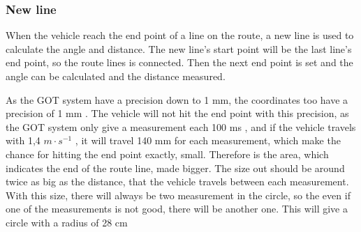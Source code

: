 \subsubsection{New line}
When the vehicle reach the end point of a line on the route, a new line is used to calculate the angle and distance. The new line's start point will be the last line's end point, so the route lines is connected. Then the next end point is set and the angle can be calculated and the distance measured.

As the GOT system have a precision down to 1 mm, the coordinates too have a precision of 1 mm . The vehicle will not hit the end point with this precision, as the GOT system only give a measurement each 100 ms , and if the vehicle travels with 1,4 $m \cdot s^{-1}$ , it will travel 140 mm for each measurement, which make the chance for hitting the end point exactly, small. Therefore is the area, which indicates the end of the route line, made bigger. The size out should be around twice as big as the distance, that the vehicle travels between each measurement. With this size, there will always be two measurement in the circle, so the even if one of the measurements is not good, there will be another one. This will give a circle with a radius of 28 cm

